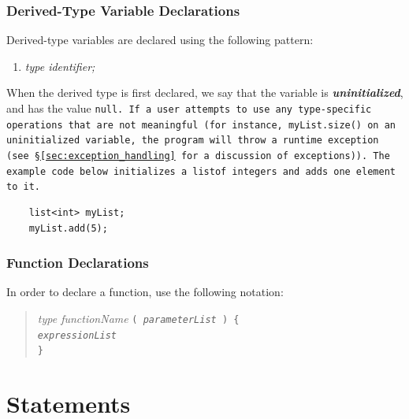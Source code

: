 \documentclass{report}
\begin{document}

\subsubsection{Derived-Type Variable Declarations} %
\label{ssub:derived_type_variable_declarations}

Derived-type variables are declared using the following pattern:

\begin{enumerate}
  \item \emph{type identifier;}
\end{enumerate}

When the derived type is first declared, we say that the variable is
\textbf{\emph{uninitialized}}, and has the value \tt null\rm. If a user
attempts to use any type-­specific operations that are not meaningful (for
instance, \tt myList.size() \rm on an uninitialized variable, the program will
throw a run­time exception (see \S \ref{sec:exception_handling} for a
discussion of exceptions)). The example code below initializes a \tt list\rm of
integers and adds one element to it.

\begin{verbatim}
    list<int> myList;
    myList.add(5);
\end{verbatim}


\subsubsection{Function Declarations} %
\label{ssub:function_declarations}

In order to declare a function, use the following notation:

\begin{quotation}
\emph{type functionName} \tt ( \rm \emph{parameterList} \tt ) \{ \rm \\
\indent \indent \emph{expressionList} \\
\indent \tt \}
\end{quotation}





\section{Statements} %
\label{sec:statements}
\end{document}
